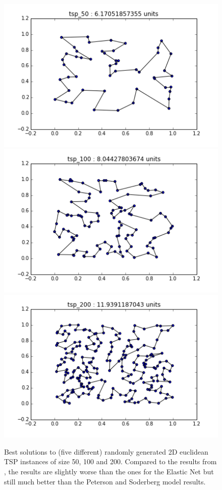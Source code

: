 \documentclass{article} %
\begin{document}
\begin{figure}[!htb]
\begin{center}
\includegraphics[scale=0.45]{figs/random_tsp_50}
\includegraphics[scale=0.45]{figs/random_tsp_100}
\includegraphics[scale=0.45]{figs/random_tsp_200}

\caption{\small Best solutions to (five different) randomly generated 2D euclidean TSP instances of size 50, 100 and 200. Compared to the results from \citep{potvin_ann}, the results are slightly worse than the ones for the Elastic Net but still much better than the Peterson and Soderberg model results.}
\end{center}
\end{figure}
\end{document}
